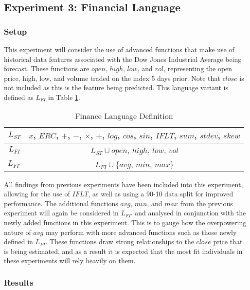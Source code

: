 \documentclass[12pt, letterpaper]{article}
\begin{document}
\subsection{Experiment 3: Financial Language}

\subsubsection{Setup}

\textrm{ \indent This experiment will consider the use of advanced functions that make use of historical data features associated with the Dow Jones Industrial Average being forecast. These functions are $open$, $high$, $low$, and $vol$, representing the open price, high, low, and volume traded on the index 5 days prior. Note that $close$ is not included as this is the feature being predicted. This language variant is defined as $L_{FI}$ in Table \ref{finance-lang}. }

\begin{table}[h!]
\centering
\begin{tabular}{||c|c||}
\hline
$L_{ST}$ & $x$, $ERC$, $+$, $-$, $\times$, $\div$, $log$, $cos$, $sin$, $IFLT$, $sum$, $stdev$, $skew$ \\
\hline
$L_{FI}$ & $L_{ST} \cup open$, $high$, $low$, $vol$ \\
\hline
$L_{FI'}$ & $L_{FI} \cup \{ avg$, $min$, $max\}$ \\
\hline
\end{tabular}
\caption{Finance Language Definition}
\label{finance-lang}
\end{table}

\textrm{ \indent All findings from previous experiments have been included into this experiment, allowing for the use of $IFLT$, as well as using a 90-10 data split for improved performance. The additional functions $avg$, $min$, and $max$ from the previous experiment will again be considered in $L_{FI'}$ and analysed in conjunction with the newly added functions in this experiment. This is to gauge how the overpowering nature of $avg$ may perform with more advanced functions such as those newly defined in $L_{FI}$. These functions draw strong relationships to the $close$ price that is being estimated, and as a result it is expected that the most fit individuals in these experiments will rely heavily on them. }

\subsubsection{Results}
\end{document}
